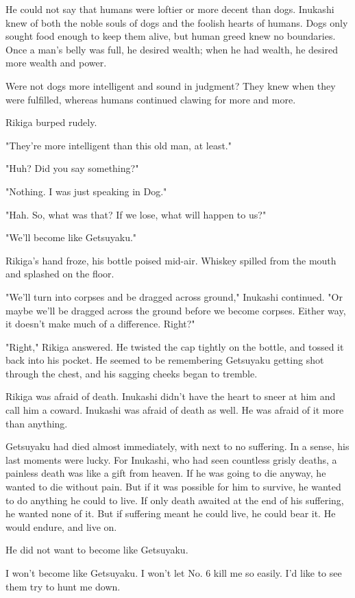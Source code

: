He could not say that humans were loftier or more decent than dogs.
Inukashi knew of both the noble souls of dogs and the foolish hearts of
humans. Dogs only sought food enough to keep them alive, but human greed
knew no boundaries. Once a man's belly was full, he desired wealth; when
he had wealth, he desired more wealth and power.

Were not dogs more intelligent and sound in judgment? They knew when
they were fulfilled, whereas humans continued clawing for more and more.

Rikiga burped rudely.

"They're more intelligent than this old man, at least."

"Huh? Did you say something?"

"Nothing. I was just speaking in Dog."

"Hah. So, what was that? If we lose, what will happen to us?"

"We'll become like Getsuyaku."

Rikiga's hand froze, his bottle poised mid-air. Whiskey spilled from the
mouth and splashed on the floor.

"We'll turn into corpses and be dragged across ground," Inukashi
continued. "Or maybe we'll be dragged across the ground before we become
corpses. Either way, it doesn't make much of a difference. Right?"

"Right," Rikiga answered. He twisted the cap tightly on the bottle, and
tossed it back into his pocket. He seemed to be remembering Getsuyaku
getting shot through the chest, and his sagging cheeks began to tremble.

Rikiga was afraid of death. Inukashi didn't have the heart to sneer at
him and call him a coward. Inukashi was afraid of death as well. He was
afraid of it more than anything.

Getsuyaku had died almost immediately, with next to no suffering. In a
sense, his last moments were lucky. For Inukashi, who had seen countless
grisly deaths, a painless death was like a gift from heaven. If he was
going to die anyway, he wanted to die without pain. But if it was
possible for him to survive, he wanted to do anything he could to live.
If only death awaited at the end of his suffering, he wanted none of it.
But if suffering meant he could live, he could bear it. He would endure,
and live on.

He did not want to become like Getsuyaku.

I won't become like Getsuyaku. I won't let No. 6 kill me so easily. I'd
like to see them try to hunt me down.

